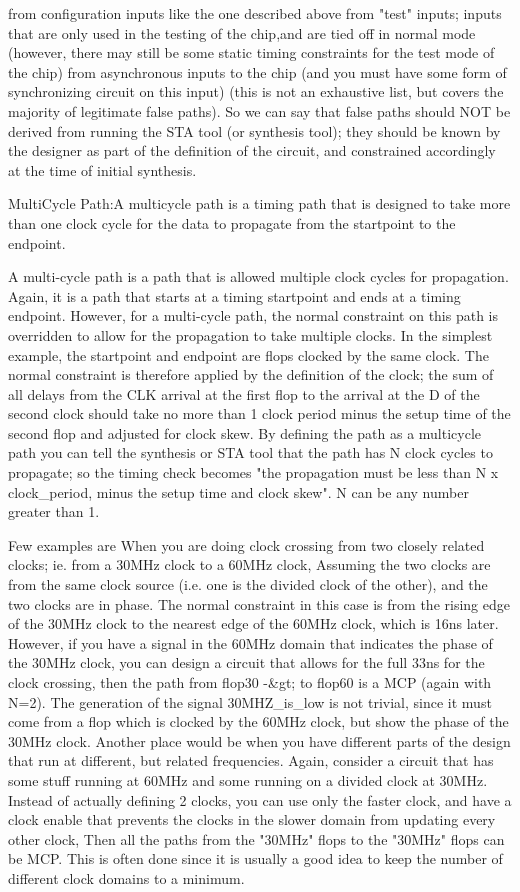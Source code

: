 from configuration inputs like the one described above
from "test" inputs; inputs that are only used in the testing of the chip,and are tied off in normal mode (however, there may still be some static timing constraints for the test mode of the chip)
from asynchronous inputs to the chip (and you must have some form of synchronizing circuit on this input) (this is not an exhaustive list, but covers the majority of legitimate false paths).
So we can say that false paths should NOT be derived from running the STA tool (or synthesis tool); they should be known by the designer as part of the definition of the circuit, and constrained accordingly at the time of initial synthesis.

MultiCycle Path:A multicycle path is a timing path that is designed to take more than one clock cycle for the data to propagate from the startpoint to the endpoint.

A multi-cycle path is a path that is allowed multiple clock cycles for propagation. Again, it is a path that starts at a timing startpoint and ends at a timing endpoint. However, for a multi-cycle path, the normal constraint on this path is overridden to allow for the propagation to take multiple clocks.
In the simplest example, the startpoint and endpoint are flops clocked by the same clock. The normal constraint is therefore applied by the definition of the clock; the sum of all delays from the CLK arrival at the first flop to the arrival at the D of the second clock should take no more than 1 clock period minus the setup time of the second flop and adjusted for clock skew.
By defining the path as a multicycle path you can tell the synthesis or STA tool that the path has N clock cycles to propagate; so the timing check becomes "the propagation must be less than N x clock_period, minus the setup time and clock skew". N can be any number greater than 1.

Few examples are
When you are doing clock crossing from two closely related clocks; ie. from a 30MHz clock to a 60MHz clock, 
Assuming the two clocks are from the same clock source (i.e. one is the divided clock of the other), and the two clocks are in phase. 
The normal constraint in this case is from the rising edge of the 30MHz clock to the nearest edge of the 60MHz clock, which is 16ns later. However, if you have a signal in the 60MHz domain that indicates the phase of the 30MHz clock, you can design a circuit that allows for the full 33ns for the clock crossing, then the path from flop30 -&gt; to flop60 is a MCP (again with N=2). 
The generation of the signal 30MHZ_is_low is not trivial, since it must come from a flop which is clocked by the 60MHz clock, but show the phase of the 30MHz clock.
Another place would be when you have different parts of the design that run at different, but related frequencies. Again, consider a circuit that has some stuff running at 60MHz and some running on a divided clock at 30MHz. 
Instead of actually defining 2 clocks, you can use only the faster clock, and have a clock enable that prevents the clocks in the slower domain from updating every other clock, 
Then all the paths from the "30MHz" flops to the "30MHz" flops can be MCP. 
This is often done since it is usually a good idea to keep the number of different clock domains to a minimum.

